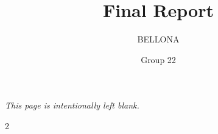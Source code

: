 \documentclass{tudelft-report}
\begin{document}
\frontmatter

\title{Final Report}

\subtitle{BELLONA}

\author{Group 22}

\subject{AE3200 Design Synthesis} %
\makecover


\clearpage
\thispagestyle{empty} %
\vspace*{\fill}
\begin{center}
    \textit{This page is intentionally left blank.}
\end{center}
\vspace*{\fill}
\clearpage




% 
%



\newpage
\begin{multicols}{2}
    \tableofcontents
\end{multicols}

% 


\mainmatter
\bgroup
\renewcommand{\arraystretch}{0.95}





% 
% 
% 
% 
% 
% 
% 
% 
% 
% 
% 
% 
\end{document}
